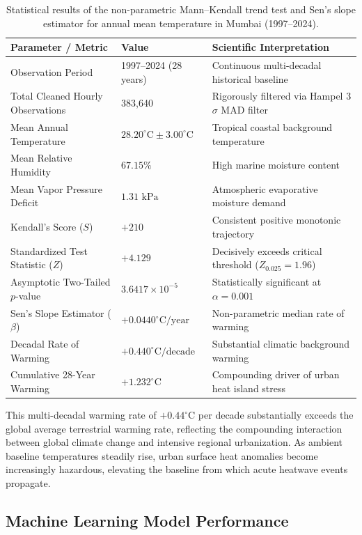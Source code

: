 \documentclass[a4paper,fleqn]{cas-sc}
\begin{document}
\begin{table}
\caption{Statistical results of the non-parametric Mann--Kendall trend test and Sen's slope estimator for annual mean temperature in Mumbai (1997--2024).}
\label{tab:trend_statistics}
\begin{tabularx}{\columnwidth}{@{}l l X@{}}
\toprule
Parameter / Metric & Value & Scientific Interpretation \\
\midrule
Observation Period & 1997--2024 (28 years) & Continuous multi-decadal historical baseline \\
Total Cleaned Hourly Observations & 383,640 & Rigorously filtered via Hampel 3$\sigma$ MAD filter \\
Mean Annual Temperature & $28.20^\circ\text{C} \pm 3.00^\circ\text{C}$ & Tropical coastal background temperature \\
Mean Relative Humidity & $67.15\%$ & High marine moisture content \\
Mean Vapor Pressure Deficit & $1.31\text{ kPa}$ & Atmospheric evaporative moisture demand \\
Kendall's Score ($S$) & $+210$ & Consistent positive monotonic trajectory \\
Standardized Test Statistic ($Z$) & $+4.129$ & Decisively exceeds critical threshold ($Z_{0.025} = 1.96$) \\
Asymptotic Two-Tailed $p$-value & $3.6417 \times 10^{-5}$ & Statistically significant at $\alpha = 0.001$ \\
Sen's Slope Estimator ($\beta$) & $+0.0440^\circ\text{C}/\text{year}$ & Non-parametric median rate of warming \\
Decadal Rate of Warming & $+0.440^\circ\text{C}/\text{decade}$ & Substantial climatic background warming \\
Cumulative 28-Year Warming & $+1.232^\circ\text{C}$ & Compounding driver of urban heat island stress \\
\bottomrule
\end{tabularx}
\end{table}

This multi-decadal warming rate of $+0.44^\circ\text{C}$ per decade substantially exceeds the global average terrestrial warming rate, reflecting the compounding interaction between global climate change and intensive regional urbanization. As ambient baseline temperatures steadily rise, urban surface heat anomalies become increasingly hazardous, elevating the baseline from which acute heatwave events propagate.

\subsection{Machine Learning Model Performance}
\label{subsec:ml_results}
\end{document}
